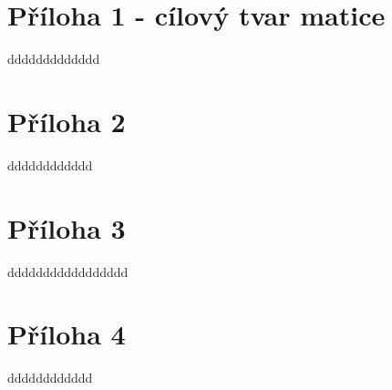 \documentclass[12pt,a4paper]{report}
\begin{document}
\section*{Příloha 1 - cílový tvar matice}
\label{P1}
ddddddddddddd
\pagebreak

\section*{Příloha 2}
\label{P2}
dddddddddddd
\pagebreak

\section*{Příloha 3}
\label{P3}
ddddddddddddddddd
\pagebreak

\section*{Příloha 4}
\label{P4}
dddddddddddd
\pagebreak


\openright
\end{document}
